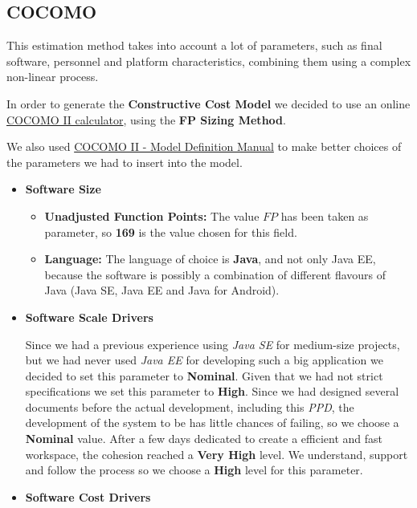 \subsection{COCOMO}
This estimation method takes into account a lot of parameters, such as final software, personnel and platform characteristics, combining them using a complex non-linear process.\par
In order to generate the \textbf{Constructive Cost Model} we decided to use an online \href{http://csse.usc.edu/tools/COCOMOII.php}{COCOMO II calculator}, using the \textbf{FP Sizing Method}.\par
We also used \href{http://csse.usc.edu/csse/research/COCOMOII/cocomo2000.0/CII_modelman2000.0.pdf}{COCOMO II - Model Definition Manual} to make better choices of the parameters we had to insert into the model.
\begin{itemize}
	\item \textbf{Software Size}
	\begin{itemize}
		\item \textbf{Unadjusted Function Points:} The value $FP$ has been taken as parameter, so \textbf{169} is the value chosen for this field.
		\item \textbf{Language:} The language of choice is \textbf{Java}, and not only Java EE, because the software is possibly a combination of different flavours of Java (Java SE, Java EE and Java for Android).
	\end{itemize}
	\item \textbf{Software Scale Drivers}
	\begin{itemize}
		 Since we had a previous experience using \textit{Java SE} for medium-size projects, but we had never used \textit{Java EE} for developing such a big application we decided to set this parameter to \textbf{Nominal}.
		 Given that we had not strict specifications we set this parameter to \textbf{High}.
		 Since we had designed several documents before the actual development, including this \textit{PPD}, the development of the system to be has little chances of failing, so we choose a \textbf{Nominal} value.
		 After a few days dedicated to create a efficient and fast workspace, the cohesion reached a \textbf{Very High} level.
		 We understand, support and follow the process so we choose a \textbf{High} level for this parameter.
	\end{itemize}
	\item \textbf{Software Cost Drivers}

\end{itemize}
